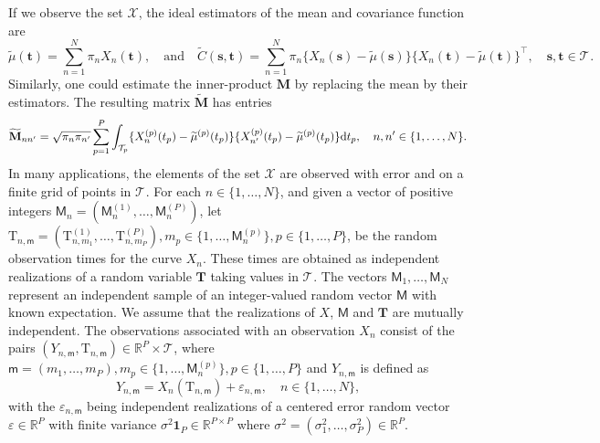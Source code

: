 \documentclass[times,sort&compress,3p]{elsarticle}
\theoremstyle{plain}%
\theoremstyle{definition}
\newcommand{\RR}{\mathbb{R}} %
\newcommand{\dd}{{\rm d}}
\newcommand{\TT}[1]{\mathcal{T}_{#1}} %
\newcommand{\pointt}{\mathbf{t}} %
\newcommand{\points}{\mathbf{s}} %
\newcommand{\Xnp}{X_n^{(p)}} %
\newcommand{\tildemup}[1]{\widetilde{\mu}^{(#1)}} %
\begin{document}
If we observe the set $\mathcal{X}$, the ideal estimators of the mean and covariance function are
\begin{equation}\label{eq:perfect_estimator}
    \widetilde{\mu}(\pointt) = \sum_{n = 1}^N \pi_n X_n(\pointt), \quad\text{and}\quad \widetilde{C}(\points, \pointt) =  \sum_{n = 1}^N \pi_n \{X_n(\points) - \widetilde{\mu}(\points)\}\{X_n(\pointt) - \widetilde{\mu}(\pointt)\}^\top, \quad \points, \pointt \in \TT{}.
\end{equation}
Similarly, one could estimate the inner-product $\mathbf{M}$ by replacing the mean by their estimators. The resulting matrix $\widetilde{\mathbf{M}}$ has entries
\begin{equation}\label{eq:perfect_gram_estimator}
    \widetilde{\mathbf{M}}_{nn^\prime} = \sqrt{\pi_n \pi_{n^{\prime}}}\sum_{p = 1}^P \int_{\TT{p}}\{\Xnp(t_p) - \tildemup{p}(t_p)\}\{X_{n^\prime}^{(p)}(t_p) - \tildemup{p}(t_p)\} \dd t_p, \quad n, n^\prime \in \{1, \dots, N\}.
\end{equation}
In many applications, the elements of the set $\mathcal{X}$ are observed with error and on a finite grid of points in $\TT{}$. For each $n \in \{1, \dots, N\}$, and given a vector of positive integers $\mathsf{M}_n = (\mathsf{M}_n^{(1)}, \dots, \mathsf{M}_n^{(P)})$, let $\mathrm{T}_{n, \mathsf{m}} = (\mathrm{T}_{n, m_1}^{(1)}, \dots, \mathrm{T}_{n, m_P}^{(P)}), m_p \in \{1, \dots, \mathsf{M}_n^{(p)}\}, p \in \{1, \dots, P\}$, be the random observation times for the curve $X_n$. These times are obtained as independent realizations of a random variable $\mathbf{T}$ taking values in $\TT{}$. The vectors $\mathsf{M}_1, \dots, \mathsf{M}_N$ represent an independent sample of an integer-valued random vector $\mathsf{M}$ with known expectation. We assume that the realizations of $X$, $\mathsf{M}$ and $\mathbf{T}$ are mutually independent. The observations associated with an observation $X_n$ consist of the pairs $(Y_{n, \mathsf{m}}, \mathrm{T}_{n, \mathsf{m}}) \in \mathbb{R}^P \times \TT{}$, where $\mathsf{m} = (m_1, \dots, m_P), m_p \in \{1, \dots, \mathsf{M}_n^{(p)}\}, p \in \{1, \dots, P\}$ and $Y_{n, \mathsf{m}}$ is defined as
\begin{equation}\label{eq:model_error}
    Y_{n, \mathsf{m}} = X_n(\mathrm{T}_{n, \mathsf{m}}) + \varepsilon_{n, \mathsf{m}}, \quad n \in \{1, \dots, N\},
\end{equation}
with the $\varepsilon_{n, \mathsf{m}}$ being independent realizations of a centered error random vector $\varepsilon \in \RR^{P}$ with finite variance $\sigma^2\mathbf{1}_P \in \RR^{P \times P}$ where $\sigma^2 = (\sigma^2_1, \dots, \sigma^2_P) \in \RR^{P}$.
\end{document}

